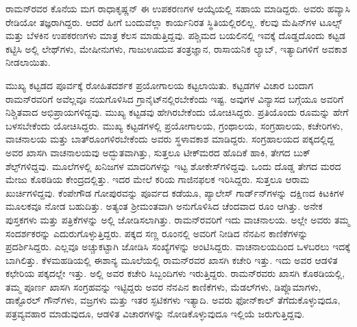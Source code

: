 ರಾಮನ್‍ರವರ ಕೊನೆಯ ಮಗ ರಾಧಾಕೃಷ್ಣನ್ ಈ ಉಪಕರಣಗಳ ಆಯ್ಕೆಯಲ್ಲಿ ಸಹಾಯ ಮಾಡಿದ್ದರು. ಅವರು ಹವ್ಯಾಸಿ ರೇಡಿಯೋ ತಜ್ಞರಾಗಿದ್ದರು. ಆದರೆ ಹೀಗೆ ಬಂದುವೆಲ್ಲಾ ಕಾರ್ಯನಿರತ ಸ್ಥಿತಿಯಲ್ಲಿರಲಿಲ್ಲ. ಕೆಲವು ಮೆಷಿನ್‍ಗಳ ಟೂಲ್ಸ್ ಮತ್ತು ಬೆಳಕಿನ ಉಪಕರಣಗಳು ಮಾತ್ರ ಕೆಲಸ ಮಾಡುತ್ತಿದ್ದವು. ಪಶ್ಚಿಮದ ಬಯಲಿನಲ್ಲಿ ಇವಕ್ಕೆ ದೊಡ್ಡದೊಂದು ಕಟ್ಟಡ ಕಟ್ಟಿಸಿ ಅಲ್ಲಿ ಲೇಥ್‍ಗಳು, ಮೇಷೀನುಗಳು, ಗಾಜುಊದುವ ತಂತ್ರಜ್ಞಾನ, ರಾಸಾಯನಿಕ ಲ್ಯಾಬ್, ಇತ್ಯಾದಿಗಳಿಗೆ ಅವಕಾಶ ನೀಡಲಾಯಿತು.

ಮುಖ್ಯ ಕಟ್ಟಡದ ಪೂರ್ವಕ್ಕೆ ರೋಹಿತದರ್ಶಕ ಪ್ರಯೋಗಾಲಯ ಕಟ್ಟಲಾಯಿತು. ಕಟ್ಟಡಗಳ ವಿಚಾರ ಬಂದಾಗ ರಾಮನ್‍ರವರಿಗೆ ಅವೆಲ್ಲವೂ ನಯಗೊಳಿಸಿದ ಗ್ರಾನೈಟ್‍ನಲ್ಲಿರಬೇಕೆಂದು ಇಷ್ಟ. ಅವುಗಳ ವಿನ್ಯಾಸದ ಬಗ್ಗೆಯೂ ಅವರಿಗೆ ನಿಶ್ಚಿತವಾದ ಅಭಿಪ್ರಾಯಗಳಿದ್ದವು. ಮುಖ್ಯ ಕಟ್ಟಡವು ಹೇಗಿರಬೇಕೆಂದು ಯೋಚಿಸಿದ್ದರು. ಪ್ರತಿಯೊಂದು ರೂಮನ್ನು ಹೇಗೆ ಬಳಸಬೇಕೆಂದು ಯೋಚಿಸಿದ್ದರು. ಮುಖ್ಯ ಕಟ್ಟಡಗಳಲ್ಲಿ ಪ್ರಯೋಗಾಲಯ, ಗ್ರಂಥಾಲಯ, ಸಂಗ್ರಹಾಲಯ, ಕಚೇರಿಗಳು, ವಾಚನಾಲಯ ಮತ್ತು ಬಾತ್‍ರೂಂಗಳಿರಬೇಕೆಂದು ಅವರು ಸ್ಥಳಾವಕಾಶ ಮಾಡಿದ್ದರು. ಸಂಗ್ರಹಾಲಯದ ಪಕ್ಕದಲ್ಲಿದ್ದ ಅವರ ಖಾಸಗಿ ವಾಚನಾಲಯವು ಅದ್ಭುತವಾಗಿತ್ತು, ಸುತ್ತಲೂ ಟೀಕ್‍ಮರದ ಹೊದಿಕೆ ಹಾಕಿ, ತೇಗದ ಬುಕ್ ಶೆಲ್ಫ್‌ಗಳಿದ್ದವು. ಮೂಲೆಗಳಲ್ಲಿ ಖನಿಜಗಳ ಮಾದರಿಗಳನ್ನು ಇಟ್ಟ ಶೋಕೇಸ್‍ಗಳಿದ್ದವು. ಒಂದು ದೊಡ್ಡ ತೇಗದ ಮರದ ಮೇಜು ಕೊಠಡಿಯ ಕೇಂದ್ರದಲ್ಲಿತ್ತು. ಇದರ ಮೇಲೆ ಕರಿಯ ಗಾಜಿನಫಲಕ ಇರಿಸಿದ್ದರು. ಸುತ್ತಲೂ ಆರಾಮ ಖುರ್ಚಿಗಳಿದ್ದವು. ಕೆಂಪೇಗೌಡ ಗೋಪುರವನ್ನು ಪೂರ್ವದ ಕಡೆಯೂ, ಪ್ಯಾಲೇಸ್ ಗಾರ್ಡ್‌ನ್‍ಗಳನ್ನು ದಕ್ಷಿಣದ ಕಿಟಕಿಗಳ ಮೂಲಕವೂ ನೋಡ ಬಹುದಿತ್ತು. ಅತ್ಯಂತ ಶ‍್ರೀಮಂತವಾಗಿ ಅನುಗೊಳಿಸಿದ ಚೆಂದವಾದ ರೂಂ ಆಗಿತ್ತು. ಅನೇಕ ಪುಸ್ತಕಗಳು ಮತ್ತು ಪತ್ರಿಕೆಗಳನ್ನು ಅಲ್ಲಿ ಜೋಡಿಸಲಾಗಿತ್ತು. ರಾಮನ್‍ರವರಿಗೆ ಇದು ವಾಚನಾಲಯ. ಅಲ್ಲೇ ಅವರು ತಮ್ಮ ಸಂದರ್ಶಕರನ್ನು ಎದುರುಗೊಳ್ಳುತ್ತಿದ್ದರು. ಪಕ್ಕದ ಸಣ್ಣ ರೂಂನಲ್ಲಿ ಅವರಿಗೆ ನೀಡಿದ ನೆನಪಿನ ಕಾಣಿಕೆಗಳನ್ನು ಪ್ರದರ್ಶಿಸಿದ್ದರು. ಎಲ್ಲವೂ ಅಚ್ಚುಕಟ್ಟಾಗಿ ಜೋಡಿಸಿ ಸಂಖ್ಯೆಗಳನ್ನು ಅಂಟಿಸಿದ್ದರು. ವಾಚನಾಲಯದಿಂದ ಒಳಬರಲು ಇದಕ್ಕೆ ಬಾಗಿಲಿತ್ತು. ಕೆಳಮಹಡಿಯಲ್ಲಿ ಈಶಾನ್ಯ ಮೂಲೆಯಲ್ಲಿ ರಾಮನ್‍ರವರ ಖಾಸಗಿ ಕಚೇರಿ ಇತ್ತು. ಇದು ಅವರ ಆಡಳಿತ ಕಛೇರಿಯ ಪಕ್ಕದಲ್ಲೇ ಇತ್ತು. ಅಲ್ಲಿ ಅವರ ಕಚೇರಿ ಸಿಬ್ಬಂದಿಗಳು ಇರುತ್ತಿದ್ದರು. ರಾಮನ್‍ರವರು ಖಾಸಗಿ ಕೊಠಡಿಯಲ್ಲಿ, ತಮ್ಮ ಪೂರ್ಣ ಖಾಸಗಿ ಸಂಗ್ರಹವನ್ನು ಇಟ್ಟಿದ್ದರು \enginline{-} ಅವರ ನೆನಪಿನ ಕಾಣಿಕೆಗಳು, ಮೆಡಲ್‍ಗಳು, ಡಿಪ್ಲೊಮಾಗಳು, ಡಾಕ್ಟೊರಲ್ ಗೌನ್‍ಗಳು, ವಜ್ರಗಳು ಮತ್ತು ಇತರ ಸ್ಫಟಿಕಗಳು ಇತ್ಯಾದಿ. ಅವರು ಫೋನ್‍ಕಾಲ್ ತೆಗೆದುಕೊಳ್ಳುವುದೂ, ಪತ್ರವ್ಯವಹಾರ ಮಾಡುವುದೂ, ಆಡಳಿತ ವಿಚಾರಗಳನ್ನು ನೋಡಿಕೊಳ್ಳುವುದೂ ಇಲ್ಲಿಯೆ ಜರುಗುತ್ತಿದ್ದವು.


